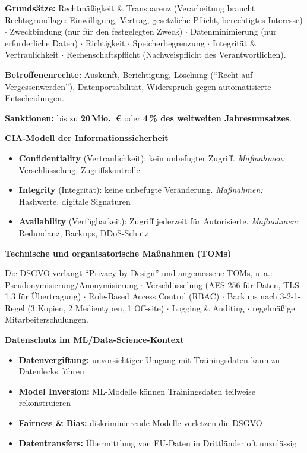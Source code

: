 \textbf{Grundsätze:} Rechtmäßigkeit \& Transparenz (Verarbeitung braucht Rechtsgrundlage: Einwilligung, Vertrag, gesetzliche Pflicht, berechtigtes Interesse) $\cdot$ Zweckbindung (nur für den festgelegten Zweck) $\cdot$ Datenminimierung (nur erforderliche Daten) $\cdot$ Richtigkeit $\cdot$ Speicherbegrenzung $\cdot$ Integrität \& Vertraulichkeit $\cdot$ Rechenschaftspflicht (Nachweispflicht des Verantwortlichen).

\textbf{Betroffenenrechte:} Auskunft, Berichtigung, Löschung (``Recht auf Vergessenwerden''), Datenportabilität, Widerspruch gegen automatisierte Entscheidungen.

\textbf{Sanktionen:} bis zu \textbf{20\,Mio.\ €} oder \textbf{4\,\% des weltweiten Jahresumsatzes}.

\textbf{CIA-Modell der Informationssicherheit}

\begin{itemize}[leftmargin=1.5em,noitemsep]
  \item \textbf{Confidentiality} (Vertraulichkeit): kein unbefugter Zugriff. \textit{Maßnahmen:} Verschlüsselung, Zugriffskontrolle
  \item \textbf{Integrity} (Integrität): keine unbefugte Veränderung. \textit{Maßnahmen:} Hashwerte, digitale Signaturen
  \item \textbf{Availability} (Verfügbarkeit): Zugriff jederzeit für Autorisierte. \textit{Maßnahmen:} Redundanz, Backups, DDoS-Schutz
\end{itemize}

\textbf{Technische und organisatorische Maßnahmen (TOMs)}

Die DSGVO verlangt ``Privacy by Design'' und angemessene TOMs, u.\,a.:
Pseudonymisierung/Anonymisierung $\cdot$ Verschlüsselung (AES-256 für Daten, TLS\,1.3 für Übertragung) $\cdot$ Role-Based Access Control (RBAC) $\cdot$ Backups nach 3-2-1-Regel (3 Kopien, 2 Medientypen, 1 Off-site) $\cdot$ Logging \& Auditing $\cdot$ regelmäßige Mitarbeiterschulungen.

\textbf{Datenschutz im ML/Data-Science-Kontext}

\begin{itemize}[leftmargin=1.5em,noitemsep]
  \item \textbf{Datenvergiftung:} unvorsichtiger Umgang mit Trainingsdaten kann zu Datenlecks führen
  \item \textbf{Model Inversion:} ML-Modelle können Trainingsdaten teilweise rekonstruieren
  \item \textbf{Fairness \& Bias:} diskriminierende Modelle verletzen die DSGVO
  \item \textbf{Datentransfers:} Übermittlung von EU-Daten in Drittländer oft unzulässig
\end{itemize}
\newpage

